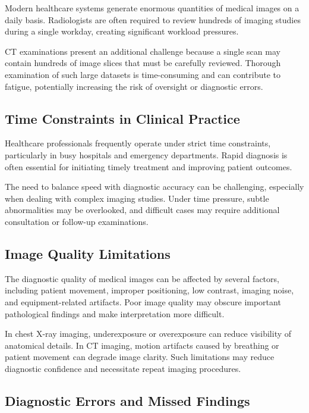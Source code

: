 Modern healthcare systems generate enormous quantities of medical images on a daily basis. Radiologists are often required to review hundreds of imaging studies during a single workday, creating significant workload pressures.

CT examinations present an additional challenge because a single scan may contain hundreds of image slices that must be carefully reviewed. Thorough examination of such large datasets is time-consuming and can contribute to fatigue, potentially increasing the risk of oversight or diagnostic errors.

\subsection{Time Constraints in Clinical Practice}

Healthcare professionals frequently operate under strict time constraints, particularly in busy hospitals and emergency departments. Rapid diagnosis is often essential for initiating timely treatment and improving patient outcomes.

The need to balance speed with diagnostic accuracy can be challenging, especially when dealing with complex imaging studies. Under time pressure, subtle abnormalities may be overlooked, and difficult cases may require additional consultation or follow-up examinations.

\subsection{Image Quality Limitations}

The diagnostic quality of medical images can be affected by several factors, including patient movement, improper positioning, low contrast, imaging noise, and equipment-related artifacts. Poor image quality may obscure important pathological findings and make interpretation more difficult.

In chest X-ray imaging, underexposure or overexposure can reduce visibility of anatomical details. In CT imaging, motion artifacts caused by breathing or patient movement can degrade image clarity. Such limitations may reduce diagnostic confidence and necessitate repeat imaging procedures.

\subsection{Diagnostic Errors and Missed Findings}

